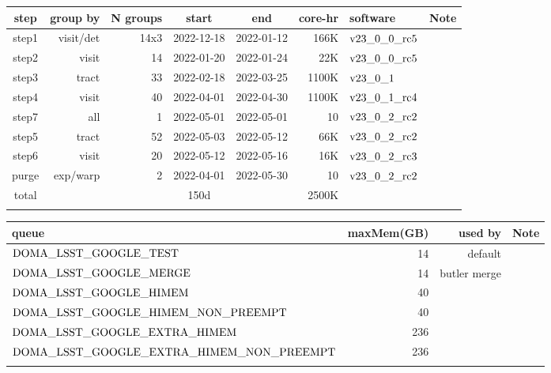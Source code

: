 \documentclass[OPS,authoryear,toc]{lsstdoc}
\begin{document}
\begin{center}
\begin{tabular} { |c|r|r|c|c|r|l|l|}
\hline
step & group by & N groups & start & end & core-hr & software & Note\\
\hline
step1 & visit/det & 14x3 &2022-12-18& 2022-01-12 & 166K & $\rm v23\_0\_0\_rc5$ &\\
step2 & visit  & 14 & 2022-01-20& 2022-01-24 & 22K & $\rm v23\_0\_0\_rc5$ &\\
step3 & tract & 33 & 2022-02-18& 2022-03-25 & 1100K & $\rm v23\_0\_1$ &\\
step4 & visit & 40& 2022-04-01& 2022-04-30 & 1100K & $\rm v23\_0\_1\_rc4$ &\\
step7 & all & 1 & 2022-05-01& 2022-05-01 & 10 & $\rm v23\_0\_2\_rc2$ &\\
step5 & tract & 52 & 2022-05-03& 2022-05-12 & 66K & $\rm v23\_0\_2\_rc2$ &\\
step6 & visit & 20&2022-05-12& 2022-05-16 & 16K & $\rm v23\_0\_2\_rc3$ &\\
purge & exp/warp & 2 & 2022-04-01& 2022-05-30 & 10 & $\rm v23\_0\_2\_rc2$ & \\
\hline
total & & & 150d & & 2500K &&\\
\hline
\label{tab:summarycpu}
\end{tabular}
\end{center}


\begin{center}
\begin{tabular} { |l|r|r|l|}
\hline
queue & maxMem(GB) & used by &  Note\\
\hline
$\rm DOMA\_LSST\_GOOGLE\_TEST$ & 14 & default &\\
$\rm DOMA\_LSST\_GOOGLE\_MERGE$ & 14 & butler merge &\\
$\rm DOMA\_LSST\_GOOGLE\_HIMEM$ & 40 &  &\\
$\rm DOMA\_LSST\_GOOGLE\_HIMEM\_NON\_PREEMPT$ & 40 & &\\
$\rm DOMA\_LSST\_GOOGLE\_EXTRA\_HIMEM$ & 236 &  &\\
$\rm DOMA\_LSST\_GOOGLE\_EXTRA\_HIMEM\_NON\_PREEMPT$ & 236 & &\\
\hline
\label{tab:queues}
\end{tabular}
\end{center}
\end{document}
